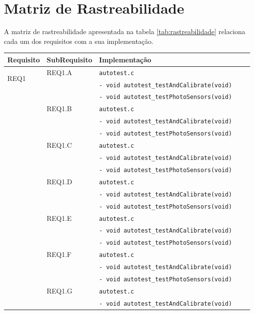 \documentclass{article}
\begin{document}
\section{Matriz de Rastreabilidade}
A matriz de rastreabilidade apresentada na tabela \ref*{tab:rastreabilidade} relaciona cada um dos requisitos com a sua implementação.
\pagebreak
\small
\begin{longtable}{|p{0.125\linewidth}|p{0.17\linewidth}|p{0.75\linewidth}|}
\hline \bfseries{Requisito} & \bfseries{SubRequisito} & \bfseries{Implementação}\\ 
		\hline 
        \multirow{2}{*}{REQ1}
        & REQ1.A & \texttt{autotest.c}\\ 
        && \texttt{- void autotest\_testAndCalibrate(void)}\\
        && \texttt{- void autotest\_testPhotoSensors(void)}\\
		\cline{2-3}
        & REQ1.B & \texttt{autotest.c}\\ 
        && \texttt{- void autotest\_testAndCalibrate(void)}\\
        && \texttt{- void autotest\_testPhotoSensors(void)}\\
        \cline{2-3}
        & REQ1.C & \texttt{autotest.c}\\ 
        && \texttt{- void autotest\_testAndCalibrate(void)}\\
        && \texttt{- void autotest\_testPhotoSensors(void)}\\
		\cline{2-3}
        & REQ1.D & \texttt{autotest.c}\\ 
        && \texttt{- void autotest\_testAndCalibrate(void)}\\
        && \texttt{- void autotest\_testPhotoSensors(void)}\\
        \cline{2-3}
        & REQ1.E & \texttt{autotest.c}\\ 
        && \texttt{- void autotest\_testAndCalibrate(void)}\\
        && \texttt{- void autotest\_testPhotoSensors(void)}\\
		\cline{2-3}
        & REQ1.F & \texttt{autotest.c}\\ 
        && \texttt{- void autotest\_testAndCalibrate(void)}\\
        && \texttt{- void autotest\_testPhotoSensors(void)}\\
		\cline{2-3}
        & REQ1.G & \texttt{autotest.c}\\ 
        && \texttt{- void autotest\_testAndCalibrate(void)}\\

\end{longtable}
\end{document}
